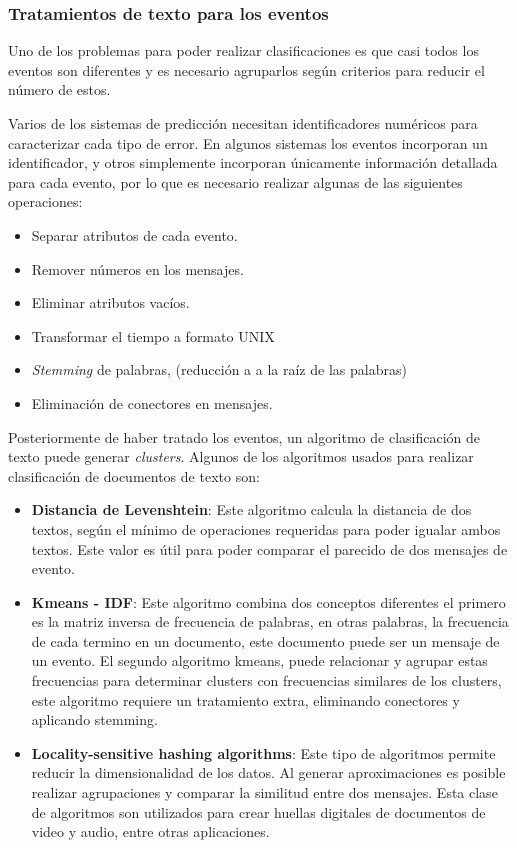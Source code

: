 \subsubsection{Tratamientos de texto para los eventos}
Uno de los problemas para poder realizar clasificaciones es que casi todos los eventos son diferentes y es necesario agruparlos según criterios para reducir el número de estos.


Varios de los sistemas de predicción necesitan identificadores numéricos para caracterizar cada tipo de error\citep{Salfner2008a}. En algunos sistemas los eventos incorporan un identificador, y otros simplemente incorporan únicamente información detallada para cada evento, por lo que es necesario realizar algunas de las siguientes operaciones:

\begin{itemize}
\item Separar atributos de cada evento.
\item Remover números en los mensajes.
\item Eliminar atributos vacíos.
\item Transformar el tiempo a formato UNIX
\item \textit{Stemming} de palabras, (reducción a a la raíz de las palabras)
\item Eliminación de conectores en mensajes.
\end{itemize}


Posteriormente de haber tratado los eventos, un algoritmo de clasificación de texto puede generar \textit{clusters}. Algunos de los algoritmos usados para realizar clasificación de documentos de texto son:

\begin{itemize}
\item \textbf{Distancia de Levenshtein}: Este algoritmo calcula la distancia de dos textos, según el mínimo de operaciones requeridas para poder igualar ambos textos. Este valor es útil para poder comparar el parecido de dos mensajes de evento.
\item \textbf{Kmeans - IDF}: Este algoritmo combina dos conceptos diferentes el primero es la matriz inversa de frecuencia de palabras, en otras palabras, la frecuencia de cada termino en un documento, este documento puede ser un mensaje de un evento. El segundo algoritmo kmeans, puede relacionar y agrupar estas frecuencias para determinar clusters con frecuencias similares de los clusters, este algoritmo requiere un tratamiento extra, eliminando conectores y aplicando stemming.
\item \textbf{Locality-sensitive hashing algorithms}: Este tipo de algoritmos permite reducir la dimensionalidad de los datos. Al generar aproximaciones es posible realizar agrupaciones y comparar la similitud entre dos mensajes. Esta clase de algoritmos son utilizados para crear huellas digitales de documentos de video y audio, entre otras aplicaciones.  
\end{itemize}

